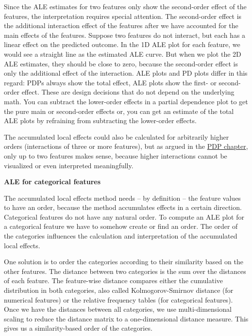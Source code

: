 \documentclass[
  10pt,
]{scrbook}
\begin{document}
Since the ALE estimates for two features only show the second-order effect of the features, the interpretation requires special attention.
The second-order effect is the additional interaction effect of the features after we have accounted for the main effects of the features.
Suppose two features do not interact, but each has a linear effect on the predicted outcome.
In the 1D ALE plot for each feature, we would see a straight line as the estimated ALE curve.
But when we plot the 2D ALE estimates, they should be close to zero, because the second-order effect is only the additional effect of the interaction.
ALE plots and PD plots differ in this regard:
PDPs always show the total effect, ALE plots show the first- or second-order effect.
These are design decisions that do not depend on the underlying math.
You can subtract the lower-order effects in a partial dependence plot to get the pure main or second-order effects or, you can get an estimate of the total ALE plots by refraining from subtracting the lower-order effects.

The accumulated local effects could also be calculated for arbitrarily higher orders (interactions of three or more features), but as argued in the \protect\hyperlink{pdp}{PDP chapter}, only up to two features makes sense, because higher interactions cannot be visualized or even interpreted meaningfully.

\textbf{ALE for categorical features}

The accumulated local effects method needs -- by definition -- the feature values to have an order, because the method accumulates effects in a certain direction.
Categorical features do not have any natural order.
To compute an ALE plot for a categorical feature we have to somehow create or find an order.
The order of the categories influences the calculation and interpretation of the accumulated local effects.

One solution is to order the categories according to their similarity based on the other features.
The distance between two categories is the sum over the distances of each feature.
The feature-wise distance compares either the cumulative distribution in both categories, also called Kolmogorov-Smirnov distance (for numerical features) or the relative frequency tables (for categorical features).
Once we have the distances between all categories, we use multi-dimensional scaling to reduce the distance matrix to a one-dimensional distance measure.
This gives us a similarity-based order of the categories.
\end{document}

